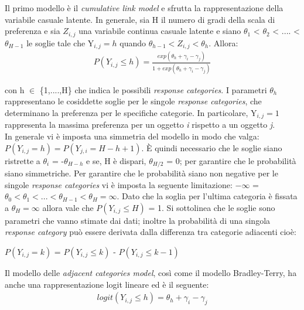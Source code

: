 Il primo modello è il \emph{cumulative link model} e sfrutta la rappresentazione della variabile casuale latente. In generale, sia H il numero di gradi della scala di preferenza e sia $Z_{i,j}$ una variabile continua casuale latente e siano $\theta_{1} $ < $\theta_{2}$ < .... < $\theta_{H-1}$ le soglie tale che Y$_{i,j} = h$ quando $\theta_{h-1} < Z_{i,j} < \theta_{h}$. Allora:
\begin{align}
	P(Y_{i,j}\leq h) =  \frac{exp(\theta_{h} + \gamma_{i} - \gamma_{j})}{1 + exp(\theta_{h} + \gamma_{i} - \gamma_{j})} \label{for:3.2.1}
\end{align}

con h $\in$ \{1,....,H\} che indica le possibili \emph{response categories}. I parametri $\theta_{h}$ rappresentano le cosiddette soglie per le singole \emph{response categories}, che determinano la preferenza per le specifiche categorie. In particolare, Y$_{i,j} = 1$ rappresenta la massima preferenza per un oggetto \textit{i} rispetto a un oggetto \textit{j}.\\
In generale vi è imposta una simmetria del modello in modo che valga: $P(Y_{i,j} = h) = P(Y_{j,i} = H - h + 1)$. È quindi necessario che le soglie siano ristrette a $\theta_{i}$ = -$\theta_{H-h}$ e se, H è dispari, $\theta_{H/2}$ = 0; per garantire che le probabilità siano simmetriche. Per garantire che le probabilità siano non negative per le singole \emph{response categories} vi è imposta la seguente limitazione: $-\infty$ = $\theta_{0} < \theta_{1} < ... < \theta_{H-1} < \theta_{H} = \infty$. Dato che la soglia per l'ultima categoria è fissata a $\theta_{H} = \infty$ allora vale che $P(Y_{i,j} \leq H)$ = 1. Si sottolinea che le soglie sono parametri che vanno stimate dai dati; inoltre la probabilità di una singola \emph{response category} può essere derivata dalla differenza tra categorie adiacenti cioè:
\begin{center}
	  $P(Y_{i,j} = k)$ = $P(Y_{i,j} \leq k)$ - $P(Y_{i,j} \leq k - 1)$
\end{center}

Il modello delle \emph{adjacent categories model}, così come il modello Bradley-Terry, ha anche una rappresentazione logit lineare ed è il seguente:
\begin{align}
	logit(Y_{i,j}\leq h) =  \theta_{h} + \gamma_i - \gamma_j 
\end{align}

